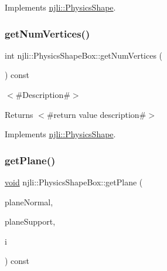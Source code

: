 Implements \mbox{\hyperlink{classnjli_1_1_physics_shape_a11cb80220393bfce177b8bdc34f7f359}{njli\+::\+Physics\+Shape}}.

\mbox{\label{classnjli_1_1_physics_shape_box_a36c3b4521b3559311f259e3c1bec1ff6}} 
\subsubsection{\texorpdfstring{get\+Num\+Vertices()}{getNumVertices()}}
{\footnotesize\ttfamily int njli\+::\+Physics\+Shape\+Box\+::get\+Num\+Vertices (\begin{DoxyParamCaption}{ }\end{DoxyParamCaption}) const\hspace{0.3cm}{\ttfamily [virtual]}}

$<$\#\+Description\#$>$

\begin{DoxyReturn}{Returns}
$<$\#return value description\#$>$ 
\end{DoxyReturn}


Implements \mbox{\hyperlink{classnjli_1_1_physics_shape_ac3f7cc28341fd58ace164bf8666480f0}{njli\+::\+Physics\+Shape}}.

\mbox{\label{classnjli_1_1_physics_shape_box_afdf7c5e8b6d17bbee2f62a0083bfd072}} 
\subsubsection{\texorpdfstring{get\+Plane()}{getPlane()}\hspace{0.1cm}{\footnotesize\ttfamily [1/2]}}
{\footnotesize\ttfamily \mbox{\hyperlink{_thread_8h_af1e856da2e658414cb2456cb6f7ebc66}{void}} njli\+::\+Physics\+Shape\+Box\+::get\+Plane (\begin{DoxyParamCaption}\item[{bt\+Vector3 \&}]{plane\+Normal,  }\item[{bt\+Vector3 \&}]{plane\+Support,  }\item[{int}]{i }\end{DoxyParamCaption}) const\hspace{0.3cm}{\ttfamily [virtual]}}


